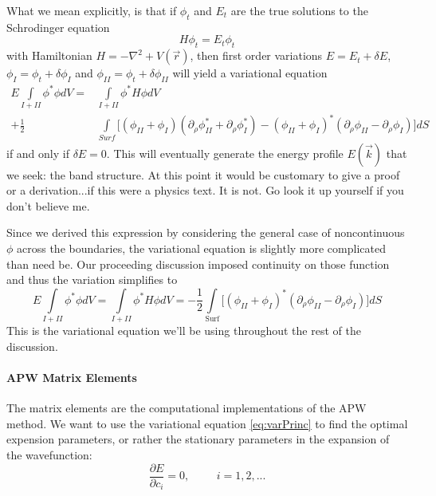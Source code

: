 \documentclass[11pt]{article}
\numberwithin{equation}{section}
\begin{document}
What we mean explicitly, is that if $\phi_t$ and $E_t$ are the true solutions to the Schrodinger equation
\begin{equation}
H\phi_t = E_t\phi_t
\end{equation}
with Hamiltonian $H = -\nabla^2 + V(\vec{r})$, then first order variations $E = E_t + \delta E$, $\phi_I = \phi_t + \delta \phi_I$ and $\phi_{II} = \phi_t + \delta\phi_{II}$ will yield a variational equation
\begin{align} 
E\int\limits_{I+II}\phi^*\phi dV = &\int\limits_{I+II}\phi^*H\phi dV \nonumber \\
+ \frac{1}{2}&\int\limits_{Surf}\big[(\phi_{II}+\phi_I)(\partial_{\rho}\phi^*_{II} + \partial_{\rho}\phi^*_I) - (\phi_{II} + \phi_I)^*(\partial_{\rho}\phi_{II} - \partial_{\rho}\phi_I)\big]dS
\end{align}
if and only if $\delta E = 0$. This will eventually generate the energy profile $E(\vec{k})$ that we seek: the band structure. At this point it would be customary to give a proof or a derivation...if this were a physics text. It is not. Go look it up yourself if you don't believe me.

Since we derived this expression by considering the general case of noncontinuous $\phi$ across the boundaries, the variational equation is slightly more complicated than need be. Our proceeding discussion imposed continuity on those function and thus the variation simplifies to
\begin{equation} \label{eq:varPrinc}
E\int\limits_{I+II}\phi^*\phi dV = \int\limits_{I+II}\phi^*H\phi dV = -\frac{1}{2}\int\limits_{\mathrm{Surf}}\big[(\phi_{II} + \phi_I)^*(\partial_{\rho}\phi_{II} - \partial_{\rho}\phi_I)\big]dS
\end{equation}
This is the variational equation we'll be using throughout the rest of the discussion.

\paragraph{APW Matrix Elements}

The matrix elements are the computational implementations of the APW method. We want to use the variational equation \ref{eq:varPrinc} to find the optimal expension parameters, or rather the stationary parameters in the expansion of the wavefunction:
\begin{equation}
\frac{\partial E}{\partial c_i} = 0, \hspace{1cm} i = 1,2,...
\end{equation}
\end{document}
